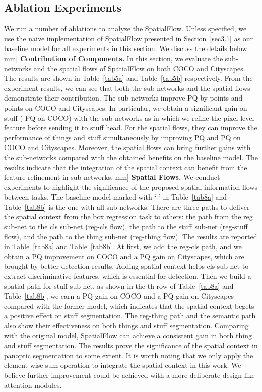 \documentclass[journal,final]{IEEEtran}
\begin{document}
\subsection{Ablation Experiments}
We run a number of ablations to analyze the SpatialFlow. Unless specified, we use the naive implementation of SpatialFlow presented in Section~\ref{sec3.1} as our baseline model for all experiments in this section. We discuss the details below.
\3mm]
\textbf{Contribution of Components.} In this section, we evaluate the sub-networks and the spatial flows of SpatialFlow on both COCO and Cityscapes. The results are shown in Table~\ref{tab5a} and Table~\ref{tab5b} respectively. From the experiment results, we can see that both the sub-networks and the spatial flows demonstrate their contribution. The sub-networks improve PQ by  points and  points on COCO and Cityscapes. In particular, we obtain a significant gain on stuff ( PQ on COCO) with the sub-networks as in which we refine the pixel-level feature before sending it to stuff head. For the spatial flows, they can improve the performance of things and stuff simultaneously by improving  PQ and  PQ on COCO and Cityscapes. Moreover, the spatial flows can bring further gains with the sub-networks compared with the obtained benefits on the baseline model. The results indicate that the integration of the spatial context can benefit from the feature refinement in sub-networks.
\3mm]
\textbf{Spatial Flows.} We conduct experiments to highlight the significance of the proposed spatial information flows between tasks. The baseline model marked with `-' in Table~\ref{tab8a} and Table~\ref{tab8b} is the one with all sub-networks. There are three paths to deliver the spatial context from the box regression task to others: the path from the reg sub-net to the cls sub-net (reg-cls flow), the path to the stuff sub-net (reg-stuff flow), and the path to the thing sub-net (reg-thing flow). The results are reported in Table~\ref{tab8a} and Table~\ref{tab8b}. At first, we add the reg-cls path, and we obtain a  PQ improvement on COCO and a  PQ gain on Cityscapes, which are brought by better detection results. Adding spatial context helps cls sub-net to extract discriminative features, which is essential for detection. Then we build a spatial path for stuff sub-net, as shown in the th row of Table~\ref{tab8a} and Table~\ref{tab8b}, we earn a  PQ gain on COCO and a  PQ gain on Cityscapes compared with the former model, which indicates that the spatial context begets a positive effect on stuff segmentation. The reg-thing path and the semantic path also show their effectiveness on both things and stuff segmentation. Comparing with the original model, SpatialFlow can achieve a consistent gain in both thing and stuff segmentation. The results prove the significance of the spatial context in panoptic segmentation to some extent. It is worth noting that we only apply the element-wise sum operation to integrate the spatial context in this work. We believe further improvement could be achieved with a more deliberate design like attention modules. 
\end{document}
